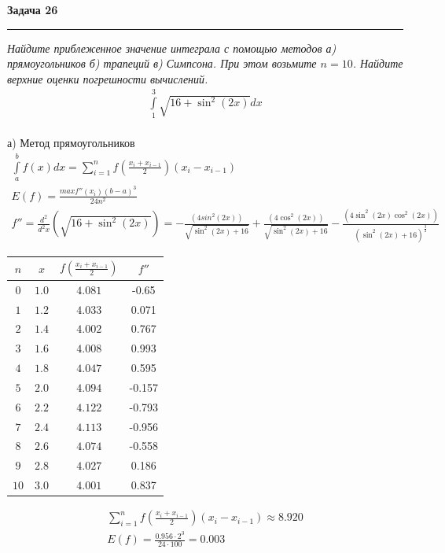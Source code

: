 \documentclass[a4paper,11pt]{article}
\begin{document}
\textbf{\large Задача 26}
\medskip\hrule\medskip
\textit{Найдите приблеженное значение интеграла с помощью методов а) прямоугольников б) трапеций в) Симпсона. При этом возьмите $ n = 10 $. Найдите верхние оценки погрешности вычислений.}
\begin{align*}
\int\limits_{1}^{3} \sqrt{16 + \sin^2(2x)} dx
\end{align*} \\
а) Метод прямоугольников 
\begin{gather*}
\int\limits_a^b f(x) dx = \sum_{i = 1}^{n} f(\frac{x_i + x_{i - 1}}{2})(x_i - x_{i - 1}) \\
E(f) = \frac{maxf''(x_i)(b - a)^3}{24n^2} \\[2pt]
f'' = \frac{d^2}{d^2x}(\sqrt{16 + \sin^2(2x)}) = -\frac{(4 sin^2(2 x))}{\sqrt{\sin^2(2 x) + 16}} + \frac{(4 \cos^2(2 x))}{\sqrt{\sin^2(2 x) + 16}} - \frac{(4 \sin^2(2 x) \cos^2(2 x))}{(\sin^2(2 x) + 16)^{\frac32}} 
\end{gather*}
\begin{center}
	\begin{tabular}{|c|c|c|c|}
		\hline
		 $ n $ & $ x $ & $ f(\frac{x_i + x_{i - 1}}2) $ & $ f'' $ \\[2pt]
		\hline
		$ 0 $  &   $ 1.0 $   &   $ 4.081 $   &  -0.65 \\[2pt]
		\hline
		$ 1 $  &   $ 1.2 $   &   $ 4.033 $   &  0.071 \\[2pt]
		\hline
		$ 2 $  &   $ 1.4 $   &   $ 4.002 $   &  0.767 \\[2pt]
		\hline
		$ 3 $  &   $ 1.6 $   &   $ 4.008 $   &   0.993 \\[2pt]
		\hline
		$ 4 $  &   $ 1.8 $   &   $ 4.047 $   &  0.595 \\[2pt]
		\hline
		$ 5 $  &   $ 2.0 $   &   $ 4.094 $   &   -0.157 \\[2pt]
		\hline
		$ 6 $  &   $ 2.2 $   &   $ 4.122 $   &  -0.793 \\[2pt]
		\hline
		$ 7 $  &   $ 2.4 $   &   $ 4.113 $   &  -0.956 \\[2pt]
		\hline
		$ 8 $  &   $ 2.6 $   &   $ 4.074 $   &  -0.558 \\[2pt]
		\hline
		$ 9 $  &   $ 2.8 $   &   $ 4.027 $   &   0.186 \\[2pt]
		\hline
		$ 10 $  &   $ 3.0 $   &   $ 4.001 $   &  0.837 \\[2pt]
		\hline
	\end{tabular}
\end{center}
\begin{gather*}
 \sum_{i = 1}^{n} f(\frac{x_i + x_{i - 1}}{2})(x_i - x_{i - 1}) \approx 8.920 \\
 E(f) = \frac{0.956 \cdot 2^3}{24 \cdot 100} = 0.003
\end{gather*}
\end{document}
